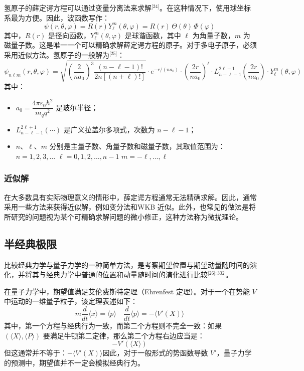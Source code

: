 氢原子的薛定谔方程可以通过变量分离法来求解\(^\text{[24]}\)。在这种情况下，使用球坐标系最为方便。因此，波函数写作：
$$
\psi(r, \theta, \varphi) = R(r) Y_{\ell}^{m}(\theta, \varphi) = R(r)\, \Theta(\theta)\, \Phi(\varphi)~
$$
其中，$R(r)$ 是径向函数，$Y_{\ell}^{m}(\theta, \varphi)$ 是球谐函数，其中 $\ell$ 为角量子数，$m$ 为磁量子数。这是唯一一个可以精确求解薛定谔方程的原子。对于多电子原子，必须采用近似方法。氢原子的一般解为\(^\text{[25]}\)：
$$
\psi_{n\ell m}(r,\theta,\varphi) = \sqrt{\left( \frac{2}{n a_0} \right)^3 \frac{(n - \ell - 1)!}{2n[(n + \ell)!]}} \cdot e^{-r / (n a_0)} \cdot \left( \frac{2r}{n a_0} \right)^\ell \cdot L_{n - \ell - 1}^{2\ell + 1} \left( \frac{2r}{n a_0} \right) \cdot Y_\ell^m(\theta, \varphi)~
$$
其中：
\begin{itemize}
\item $a_0 = \dfrac{4\pi \varepsilon_0 \hbar^2}{m_q q^2}$ 是玻尔半径；
\item $L_{n - \ell - 1}^{2\ell + 1}(\cdots)$ 是广义拉盖尔多项式，次数为 $n - \ell - 1$；
\item $n$、$\ell$、$m$ 分别是主量子数、角量子数和磁量子数，其取值范围为：$n = 1, 2, 3, \dots$ $\ell = 0, 1, 2, \dots, n - 1$ $m = -\ell, \dots, \ell$
\end{itemize}
\subsubsection{近似解}
在大多数具有实际物理意义的情形中，薛定谔方程通常无法精确求解。因此，通常采用一些方法来获得近似解，例如变分法和WKB 近似。此外，也常见的做法是将所研究的问题视为某个可精确求解问题的微小修正，这种方法称为微扰理论。
\subsection{半经典极限}
比较经典力学与量子力学的一种简单方法，是考察期望位置与期望动量随时间的演化，并将其与经典力学中普通的位置和动量随时间的演化进行比较\(^\text{[26]: 302 }\)。

在量子力学中，期望值满足艾伦费斯特定理（Ehrenfest 定理）。对于一个在势能 $V$ 中运动的一维量子粒子，该定理表述如下：
$$
m \frac{d}{dt} \langle x \rangle = \langle p \rangle \quad \frac{d}{dt} \langle p \rangle = -\langle V'(X) \rangle~
$$
其中，第一个方程与经典行为一致，而第二个方程则不完全一致：如果 $(\langle X \rangle, \langle P \rangle)$ 要满足牛顿第二定律，那么第二个方程右边应当是：
$$
- V'\left( \langle X \rangle \right)~
$$
但这通常并不等于：$- \langle V'(X) \rangle$因此，对于一般形式的势函数导数 $V'$，量子力学的预测中，期望值并不一定会模拟经典行为。

